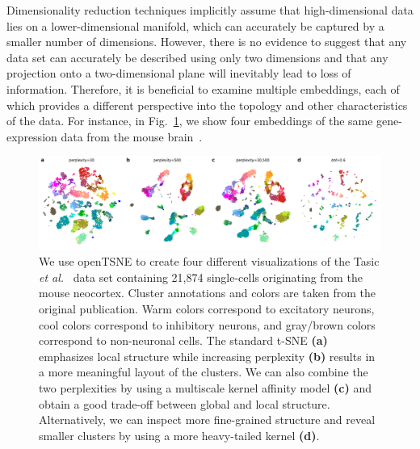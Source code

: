 \documentclass[twocolumn]{bmcart}
\begin{document}
Dimensionality reduction techniques implicitly assume that high-dimensional data lies on a lower-dimensional manifold, which can accurately be captured by a smaller number of dimensions. However, there is no evidence to suggest that any data set can accurately be described using only two dimensions and that any projection onto a two-dimensional plane will inevitably lead to loss of information. Therefore, it is beneficial to examine multiple embeddings, each of which provides a different perspective into the topology and other characteristics of the data. For instance, in Fig.~\ref{fig:tasic}, we show four embeddings of the same gene-expression data from the mouse brain~\cite{tasic2018shared}.
\begin{figure}[htbp]
  \includegraphics[width=\textwidth]{tasic2018}
  \caption{\label{fig:tasic}We use openTSNE to create four different visualizations of the Tasic \textit{et al.}~\cite{tasic2018shared} data set containing 21,874 single-cells originating from the mouse neocortex. Cluster annotations and colors are taken from the original publication. Warm colors correspond to excitatory neurons, cool colors correspond to inhibitory neurons, and gray/brown colors correspond to non-neuronal cells. The standard t-SNE \textbf{(a)} emphasizes local structure while increasing perplexity \textbf{(b)} results in a more meaningful layout of the clusters. We can also combine the two perplexities by using a multiscale kernel affinity model \textbf{(c)} and obtain a good trade-off between global and local structure. Alternatively, we can inspect more fine-grained structure and reveal smaller clusters by using a more heavy-tailed kernel \textbf{(d)}.}
\end{figure}
\end{document}
